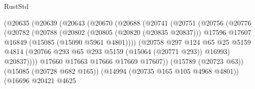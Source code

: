 \begin{lexlean}{RustStd}
\begin{coremodule}
                                  (@20635
                                    (@20639
                                      (@20643
                                        (@20670
                                          (@20688
                                            (@20741
                                              (@20751
                                                (@20756
                                                  (@20776
                                                    (@20782
                                                      (@20788
                                                        (@20802
                                                          (@20805 (@20820 (@20835 @20837)))
                                                          @17596
                                                          @17607
                                                          @16849
                                                          (@15085 (@15090 @5961 @4801))))
                                                      (@20758
                                                        @297
                                                        @124
                                                        @65
                                                        @25
                                                        @5159
                                                        @4814
                                                        (@20766
                                                          @293
                                                          @65
                                                          @293
                                                          @5159
                                                          (@15064 (@20771 @293))
                                                          @16993)
                                                        @20837))))
                                                @17660
                                                @17663
                                                @17666
                                                @17669
                                                @17607))
                                            (@15789 (@20723 @63))
                                            (@15085 (@20728 @682 @165))
                                            (@14994 (@20735 @165 @105 @4968 @4801))
                                            (@16696
                                              @20421
                                              @4625

\end{coremodule}
\end{lexlean}
